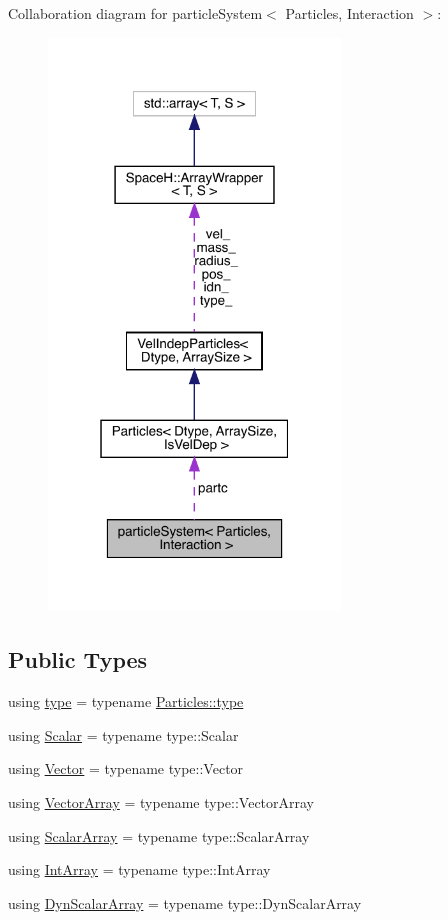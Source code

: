 Collaboration diagram for particle\+System$<$ Particles, Interaction $>$\+:
\nopagebreak
\begin{figure}[H]
\begin{center}
\leavevmode
\includegraphics[width=220pt]{classparticle_system__coll__graph}
\end{center}
\end{figure}
\subsection*{Public Types}
\begin{DoxyCompactItemize}
\item 
using \mbox{\hyperlink{classparticle_system_a7919ed2c8b419f26da20a3bd43ba5fcd}{type}} = typename \mbox{\hyperlink{class_vel_indep_particles_a0c62b43c2f0a50565e5e06587fddee18}{Particles\+::type}}
\item 
using \mbox{\hyperlink{classparticle_system_a3938954186247e3eab01cc75fcc62b40}{Scalar}} = typename type\+::\+Scalar
\item 
using \mbox{\hyperlink{classparticle_system_a76c99c2b05db108a24c6e6ccbbd93af1}{Vector}} = typename type\+::\+Vector
\item 
using \mbox{\hyperlink{classparticle_system_ac8049667a0d05e76b836642503a71c12}{Vector\+Array}} = typename type\+::\+Vector\+Array
\item 
using \mbox{\hyperlink{classparticle_system_a7f143d2466bd0f78d79cccd3493a756b}{Scalar\+Array}} = typename type\+::\+Scalar\+Array
\item 
using \mbox{\hyperlink{classparticle_system_aea9c70dc1a9d1947b425f5383fb21e24}{Int\+Array}} = typename type\+::\+Int\+Array
\item 
using \mbox{\hyperlink{classparticle_system_a768fe562ed8dcc0973f3d422708835bf}{Dyn\+Scalar\+Array}} = typename type\+::\+Dyn\+Scalar\+Array
\end{DoxyCompactItemize}
